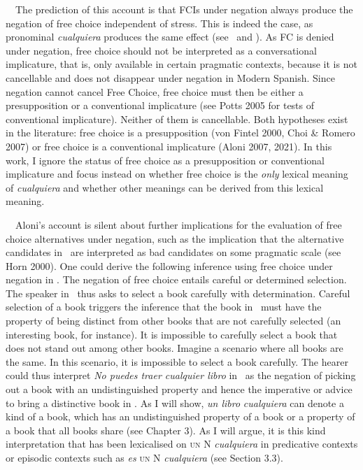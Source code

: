 \documentclass[10pt]{article}
\newenvironment{styleStandard}{\renewcommand\baselinestretch{1.25}\setlength\leftskip{0cm}\setlength\rightskip{0cm}\setlength\parindent{0cm}\setlength\parfillskip{0pt plus 1fil}\setlength\parskip{0in plus 1pt}\writerlistparindent\writerlistleftskip\leavevmode\normalfont\normalsize\fontsize{12pt}{14.4pt}\selectfont\writerlistlabel\ignorespaces}{\unskip\vspace{0in plus 1pt}\par}
\newcommand\writerlistleftskip{}
\newcommand\writerlistparindent{}
\newcommand\writerlistlabel{}
\begin{document}
\begin{styleStandard}
\ \ The prediction of this account is that FCIs under negation always produce the negation of free choice independent of stress. This is indeed the case, as pronominal \textit{cualquiera} produces the same effect (see \ and ). As FC is denied under negation, free choice should not be interpreted as a conversational implicature, that is, only available in certain pragmatic contexts, because it is not cancellable and does not disappear under negation in Modern Spanish. Since negation cannot cancel Free Choice, free choice must then be either a presupposition or a conventional implicature (see Potts 2005 for tests of conventional implicature). Neither of them is cancellable. Both hypotheses exist in the literature: free choice is a presupposition (von Fintel 2000, Choi \& Romero 2007) or free choice is a conventional implicature (Aloni 2007, 2021). In this work, I ignore the status of free choice as a presupposition or conventional implicature and focus instead on whether free choice is the \textit{only} lexical meaning of \textit{cualquiera} and whether other meanings can be derived from this lexical meaning. 
\end{styleStandard}

\begin{styleStandard}
\ \ Aloni’s account is silent about further implications for the evaluation of free choice alternatives under negation, such as the implication that the alternative candidates in \ are interpreted as bad candidates on some pragmatic scale (see Horn 2000). One could derive the following inference using free choice under negation in . The negation of free choice entails careful or determined selection. The speaker in \ thus asks to select a book carefully with determination. Careful selection of a book triggers the inference that the book in \ must have the property of being distinct from other books that are not carefully selected (an interesting book, for instance). It is impossible to carefully select a book that does not stand out among other books. Imagine a scenario where all books are the same. In this scenario, it is impossible to select a book carefully. The hearer could thus interpret \textit{No puedes traer cualquier libro} in \ as the negation of picking out a book with an undistinguished property and hence the imperative or advice to bring a distinctive book in . As I will show, \textit{un libro} \textit{cualquiera} can denote a kind of a book, which has an undistinguished property of a book or a property of a book that all books share (see Chapter 3). As I will argue, it is this kind interpretation that has been lexicalised on \textsc{un} N \textit{cualquiera} in predicative contexts or episodic contexts such as \textit{es }\textsc{un}\textit{ }N\textit{ cualquiera} (see Section 3.3). 
\end{styleStandard}
\end{document}
